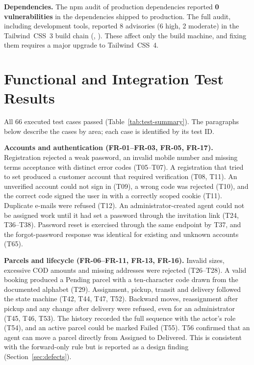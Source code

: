 \textbf{Dependencies.} The npm audit of production dependencies reported \textbf{0 vulnerabilities} in the dependencies shipped to production. The full audit, including development tools, reported 8 advisories (6 high, 2 moderate) in the Tailwind~CSS~3 build chain (, ). These affect only the build machine, and fixing them requires a major upgrade to Tailwind~CSS~4.

\section{Functional and Integration Test Results}
\label{sec:functional}

All 66 executed test cases passed (Table~\ref{tab:test-summary}). The paragraphs below describe the cases by area; each case is identified by its test ID.



\textbf{Accounts and authentication (FR-01--FR-03, FR-05, FR-17).} Registration rejected a weak password, an invalid mobile number and missing terms acceptance with distinct error codes (T05--T07). A registration that tried to set  produced a customer account that required verification (T08, T11). An unverified account could not sign in (T09), a wrong code was rejected (T10), and the correct code signed the user in with a correctly scoped  cookie (T11). Duplicate e-mails were refused (T12). An administrator-created agent could not be assigned work until it had set a password through the invitation link (T24, T36--T38). Password reset is exercised through the same endpoint by T37, and the forgot-password response was identical for existing and unknown accounts (T65).

\textbf{Parcels and lifecycle (FR-06--FR-11, FR-13, FR-16).} Invalid sizes, excessive COD amounts and missing addresses were rejected (T26--T28). A valid booking produced a Pending parcel with a ten-character code drawn from the documented alphabet (T29). Assignment, pickup, transit and delivery followed the state machine (T42, T44, T47, T52). Backward moves, reassignment after pickup and any change after delivery were refused, even for an administrator (T45, T46, T53). The history recorded the full sequence with the actor's role (T54), and an active parcel could be marked Failed (T55). T56 confirmed that an agent can move a parcel directly from Assigned to Delivered. This is consistent with the forward-only rule but is reported as a design finding (Section~\ref{sec:defects}).

